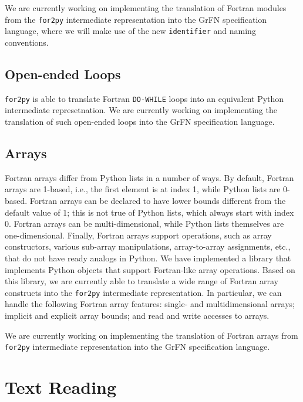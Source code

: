 \documentclass[article, 12pt, oneside]{memoir}
\begin{document}
We are currently working on implementing the translation of Fortran
modules from the \texttt{for2py} intermediate representation into the GrFN
specification language, where we will make use of the new
\texttt{identifier} and naming conventions.

\hypertarget{open-ended-loops}{%
\subsection{Open-ended Loops}\label{open-ended-loops}}

\texttt{for2py} is able to translate Fortran \texttt{DO-WHILE} loops
into an equivalent Python intermediate represetnation. We are currently
working on implementing the translation of such open-ended loops into
the GrFN specification language.

\hypertarget{arrays}{%
\subsection{Arrays}\label{arrays}}

Fortran arrays differ from Python lists in a number of ways. By default,
Fortran arrays are 1-based, i.e., the first element is at index 1, while
Python lists are 0-based. Fortran arrays can be declared to have lower
bounds different from the default value of 1; this is not true of Python
lists, which always start with index 0. Fortran arrays can be
multi-dimensional, while Python lists themselves are one-dimensional.
Finally, Fortran arrays support operations, such as array constructors,
various sub-array manipulations, array-to-array assignments, etc., that
do not have ready analogs in Python. We have implemented a library that
implements Python objects that support Fortran-like array operations.
Based on this library, we are currently able to translate a wide range
of Fortran array constructs into the \texttt{for2py} intermediate
representation. In particular, we can handle the following Fortran array
features: single- and multidimensional arrays; implicit and explicit
array bounds; and read and write accesses to arrays.

We are currently working on implementing the translation of Fortran
arrays from \texttt{for2py} intermediate representation into the GrFN
specification language.


\hypertarget{text-reading}{%
\section{Text Reading}\label{text-reading}}
\end{document}
